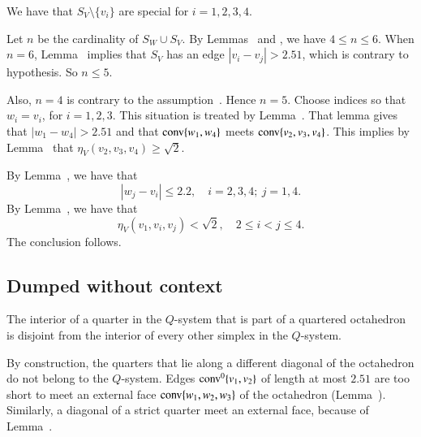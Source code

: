 \begin{tarskidata}
\begin{tarski}
\begin{proved}
We have that $S_V\setminus\{v_i\}$ are
special for $i=1,2,3,4$.

Let $n$ be the cardinality of $S_W\cup S_V$.  By Lemmas~
and , we have $4\le n\le 6$.  When
$n=6$, Lemma~ implies that $S_V$ has an edge
$|v_i-v_j|>2.51$, which is contrary to hypothesis.  So $n\le 5$.

Also, $n=4$ is contrary to the assumption~. 
Hence $n=5$.  
Choose indices so that $w_i=v_i$, for $i=1,2,3$. 
This situation is treated by Lemma~.
That lemma gives that $|w_1-w_4|>2.51$ and that
  ${\operatorname{conv}}\{w_1,w_4\}$ meets ${\operatorname{conv}}\{v_2,v_3,v_4\}$.
This implies by Lemma~ that 
$\eta_V(v_2,v_3,v_4)\ge\sqrt2$.

By Lemma~, we have that 
$$|w_j-v_i|\le 2.2,\quad i=2,3,4;\ j=1,4.$$
By Lemma~, we have that 
 $$\eta_V(v_1,v_i,v_j) < \sqrt2,\quad 2\le i < j \le 4.$$
The conclusion follows.
\swallowed\end{proved}
\end{tarski}



\begin{tarski}
\section{Dumped without context}

\begin{lemma} 
The interior of a quarter in the $Q$-system that is part of a
quartered octahedron is disjoint from the interior of every other
simplex in the $Q$-system.
\end{lemma}

\begin{proved} By construction, the quarters that lie along a
different diagonal of the octahedron do not belong to the
$Q$-system.  Edges ${\operatorname{conv}}^0\{v_1,v_2\}$  
of length at most $2.51$ are too short to meet
an external face ${\operatorname{conv}}\{w_1,w_2,w_3\}$ of the octahedron
(Lemma~). Similarly, a diagonal of a
strict quarter meet an external face,
because of Lemma~.
\swallowed\end{proved}
\end{tarski}




\end{tarskidata}
